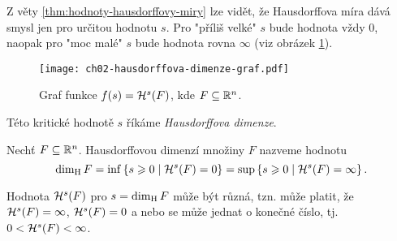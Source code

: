 Z věty \ref{thm:hodnoty-hausdorffovy-miry} lze vidět, že Hausdorffova míra dává smysl jen pro určitou hodnotu $s$. Pro "příliš velké" $s$ bude hodnota vždy $0$, naopak pro "moc malé" $s$ bude hodnota rovna $\infty$ (viz obrázek \ref{fig:hausdorffova-dimenze-graf}).
\begin{figure}[h]
    \centering
    \texttt{[image: ch02-hausdorffova-dimenze-graf.pdf]}
    \caption{Graf funkce $f(s)=\mathcal{H}^s(F)$, kde $F\subseteq\mathbb{R}^n$.}
    \label{fig:hausdorffova-dimenze-graf}
\end{figure}
Této kritické hodnotě $s$ říkáme \emph{Hausdorffova dimenze}.
\begin{definition}\label{def:hausdorffova-dimenze}
    Nechť $F\subseteq\mathbb{R}^n$. Hausdorffovou dimenzí množiny $F$ nazveme hodnotu
    \[\operatorname{dim_H}{F}=\inf\left\{s\geqslant 0\mid\mathcal{H}^s(F)=0\right\}=\sup\left\{s\geqslant 0\mid\mathcal{H}^s(F)=\infty\right\}.\]
\end{definition}
Hodnota $\mathcal{H}^s(F)$ pro $s=\operatorname{dim_H}{F}$ může být různá, tzn. může platit, že $\mathcal{H}^s(F)=\infty$, $\mathcal{H}^s(F)=0$ a nebo se může jednat o konečné číslo, tj. $0<\mathcal{H}^s(F)<\infty$.